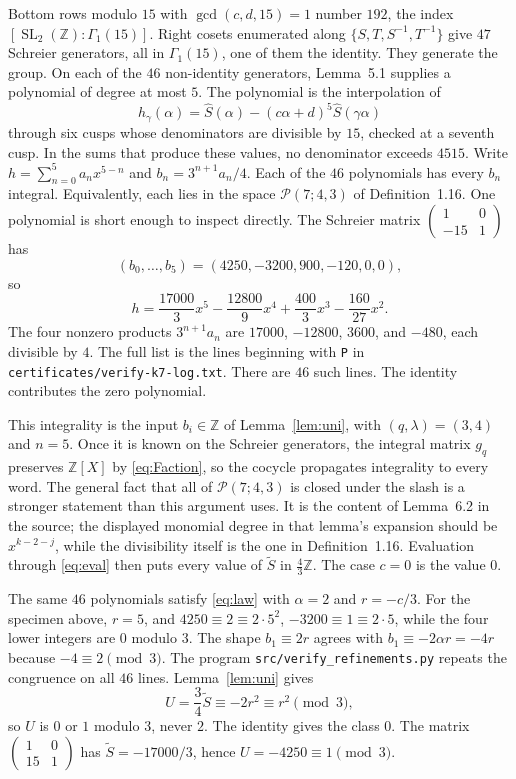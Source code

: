 \documentclass[11pt]{article}
\theoremstyle{remark}
\newcommand{\tS}{\widetilde{S}}
\newcommand{\Z}{\mathbb{Z}}
\newcommand{\SL}{\operatorname{SL}}
\begin{document}
Bottom rows modulo \(15\) with \(\gcd(c,d,15)=1\) number \(192\), the index \([\SL_2(\Z):\Gamma_1(15)]\).
Right cosets enumerated along \(\{S,T,S^{-1},T^{-1}\}\) give \(47\) Schreier generators, all in \(\Gamma_1(15)\), one of them the identity.
They generate the group.
On each of the \(46\) non-identity generators, Lemma~5.1 supplies a polynomial of degree at most \(5\).
The polynomial is the interpolation of
\[
h_\gamma(\alpha)=\widehat{S}(\alpha)-(c\alpha+d)^5\widehat{S}(\gamma\alpha)
\]
through six cusps whose denominators are divisible by \(15\), checked at a seventh cusp.
In the sums that produce these values, no denominator exceeds \(4515\).
Write \(h=\sum_{n=0}^{5}a_n x^{5-n}\) and \(b_n=3^{n+1}a_n/4\).
Each of the \(46\) polynomials has every \(b_n\) integral.
Equivalently, each lies in the space \(\mathcal{P}(7;4,3)\) of Definition~1.16.
One polynomial is short enough to inspect directly.
The Schreier matrix \(\begin{pmatrix}1&0\\-15&1\end{pmatrix}\) has
\[
(b_0,\ldots,b_5)=(4250,-3200,900,-120,0,0),
\]
so
\[
h=\frac{17000}{3}x^5-\frac{12800}{9}x^4+\frac{400}{3}x^3-\frac{160}{27}x^2.
\]
The four nonzero products \(3^{n+1}a_n\) are \(17000\), \(-12800\), \(3600\), and \(-480\), each divisible by \(4\).
The full list is the lines beginning with \texttt{P} in \texttt{certificates/verify-k7-log.txt}.
There are \(46\) such lines.
The identity contributes the zero polynomial.

This integrality is the input \(b_i\in\Z\) of Lemma~\ref{lem:uni}, with \((q,\lambda)=(3,4)\) and \(n=5\).
Once it is known on the Schreier generators, the integral matrix \(g_q\) preserves \(\Z[X]\) by \eqref{eq:Faction}, so the cocycle propagates integrality to every word.
The general fact that all of \(\mathcal{P}(7;4,3)\) is closed under the slash is a stronger statement than this argument uses.
It is the content of Lemma~6.2 in the source; the displayed monomial degree in that lemma's expansion should be \(x^{k-2-j}\), while the divisibility itself is the one in Definition~1.16.
Evaluation through \eqref{eq:eval} then puts every value of \(\tS\) in \(\tfrac43\Z\).
The case \(c=0\) is the value \(0\).

The same \(46\) polynomials satisfy \eqref{eq:law} with \(\alpha=2\) and \(r=-c/3\).
For the specimen above, \(r=5\), and \(4250\equiv 2\equiv 2\cdot 5^2\), \(-3200\equiv 1\equiv 2\cdot 5\), while the four lower integers are \(0\) modulo \(3\).
The shape \(b_1\equiv 2r\) agrees with \(b_1\equiv -2\alpha r=-4r\) because \(-4\equiv 2\pmod{3}\).
The program \texttt{src/verify\_refinements.py} repeats the congruence on all \(46\) lines.
Lemma~\ref{lem:uni} gives
\[
U=\frac34\tS\equiv -2r^2\equiv r^2\pmod{3},
\]
so \(U\) is \(0\) or \(1\) modulo \(3\), never \(2\).
The identity gives the class \(0\).
The matrix \(\begin{pmatrix}1&0\\15&1\end{pmatrix}\) has \(\tS=-17000/3\), hence \(U=-4250\equiv 1\pmod{3}\).
\end{document}
